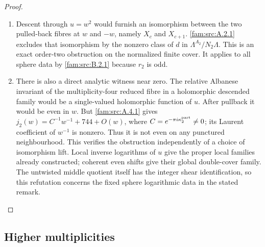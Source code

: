 \begin{proof}
\begin{enumerate}[label=\arabic*.,leftmargin=*]
\item Descent through $u=w^2$ would furnish an isomorphism between the two pulled-back fibres at $w$ and $-w$, namely $X_c$ and $X_{c+1}$. \ref{fam:src:A.2.1} excludes that isomorphism by the nonzero class of $d$ in $\Lambda^{A_2}/N_2\Lambda$. This is an exact order-two obstruction on the normalized finite cover. It applies to all sphere data by \ref{fam:src:B.2.1} because $r_2$ is odd.

\item There is also a direct analytic witness near zero. The relative Albanese invariant of the multiplicity-four reduced fibre in a holomorphic descended family would be a single-valued holomorphic function of $u$. After pullback it would be even in $w$. But \ref{fam:src:A.4.1} gives $j_2(w)=C^{-1}w^{-1}+744+O(w)$, where $C=e^{-\pi i\kappa_2^{\rm part}}\ne0$; its Laurent coefficient of $w^{-1}$ is nonzero. Thus it is not even on any punctured neighbourhood. This verifies the obstruction independently of a choice of isomorphism lift. Local inverse logarithms of $u$ give the proper local families already constructed; coherent even shifts give their global double-cover family. The untwisted middle quotient itself has the integer shear identification, so this refutation concerns the fixed sphere logarithmic data in the stated remark.
\end{enumerate}
\end{proof}

\subsection{Higher multiplicities}\label{fam:section:B.3}

